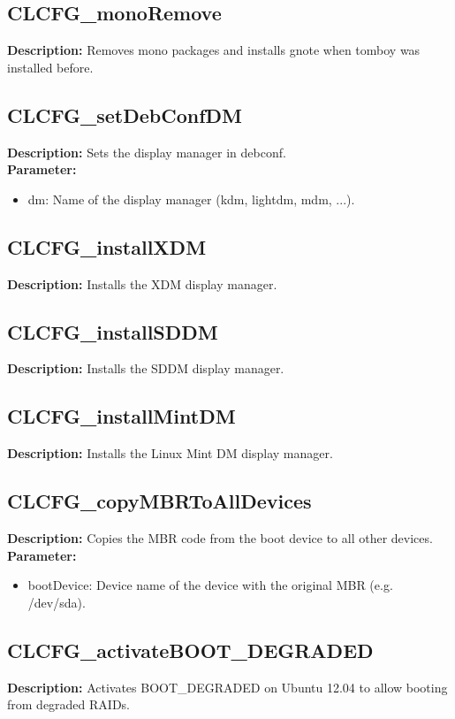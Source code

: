 \subsection{CLCFG\_monoRemove}
\textbf{Description:} Removes mono packages and installs gnote when tomboy was installed before.\\

\subsection{CLCFG\_setDebConfDM}
\textbf{Description:} Sets the display manager in debconf.\\
\textbf{Parameter:}
\begin{itemize}
\item dm: Name of the display manager (kdm, lightdm, mdm, ...).
\end{itemize}

\subsection{CLCFG\_installXDM}
\textbf{Description:} Installs the XDM display manager.\\

\subsection{CLCFG\_installSDDM}
\textbf{Description:} Installs the SDDM display manager.\\

\subsection{CLCFG\_installMintDM}
\textbf{Description:} Installs the Linux Mint DM display manager.\\

\subsection{CLCFG\_copyMBRToAllDevices}
\textbf{Description:} Copies the MBR code from the boot device to all other devices.\\
\textbf{Parameter:}
\begin{itemize}
\item bootDevice: Device name of the device with the original MBR (e.g. /dev/sda).
\end{itemize}

\subsection{CLCFG\_activateBOOT\_DEGRADED}
\textbf{Description:} Activates BOOT\_DEGRADED on Ubuntu 12.04 to allow booting from degraded RAIDs.\\

